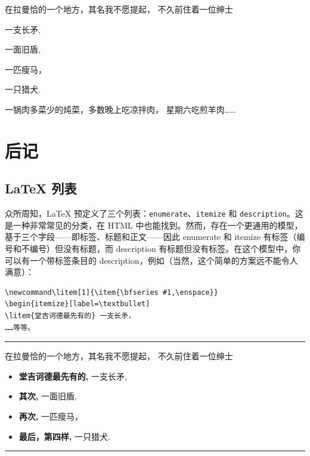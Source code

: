\documentclass[a4paper]{ltxguide}
\begin{document}
\begin{enumerate}[leftmargin=*]
\begin{enumerate}[leftmargin=\parindent]
\begin{enumerate}[labelindent=\parindent,|\allowbreak
| leftmargin=*,|\allowbreak| label=\Roman*.,|\allowbreak
| widest=III,|\allowbreak| align=left]
\begin{enumerate}[label=\fbox{\arabic*}]
在拉曼恰的一个地方，其名我不愿提起，
不久前住着一位绅士
\begin{description}[font=\sffamily\bfseries, leftmargin=3cm,
    style=multiline]
\item[\textnormal{堂吉诃德最先有的}] 一支长矛,
\item[\textnormal{其次}] 一面旧盾,
\item[\textnormal{再次}] 一匹瘦马，
\item[\textnormal{最后，第四样}] 一只猎犬.
\end{description}
一锅肉多菜少的炖菜，多数晚上吃凉拌肉，
星期六吃煎羊肉……

\fi

\normalsize

\section{后记}

\subsection{\LaTeX{} 列表}

众所周知，\LaTeX{} 预定义了三个列表：\texttt{enumerate}、\texttt{itemize} 和 \texttt{description}。这是一种非常常见的分类，在 HTML 中也能找到。然而，存在一个更通用的模型，基于三个字段——即标签、标题和正文——因此 enumerate 和 itemize 有标签（编号和不编号）但没有标题，而 description 有标题但没有标签。在这个模型中，你可以有一个带标签条目的 description，例如（当然，这个简单的方案远不能令人满意）：
\begin{verbatim}
\newcommand\litem[1]{\item{\bfseries #1,\enspace}}
\begin{itemize}[label=\textbullet]
\litem{堂吉诃德最先有的} 一支长矛，
……等等。
\end{verbatim}

\vskip6pt
\goodbreak
\hrule
\vskip6pt

\newcommand\litem[1]{\item{\bfseries #1,\enspace}}
在拉曼恰的一个地方，其名我不愿提起，
不久前住着一位绅士
\begin{itemize}[label=\textbullet]
\litem{堂吉诃德最先有的} 一支长矛,
\litem{其次} 一面旧盾,
\litem{再次} 一匹瘦马，
\litem{最后，第四样} 一只猎犬.
\end{itemize}

\vskip6pt
\goodbreak
\hrule
\vskip6pt



\end{enumerate}
\end{enumerate}
\end{enumerate}
\end{enumerate}
\end{document}
